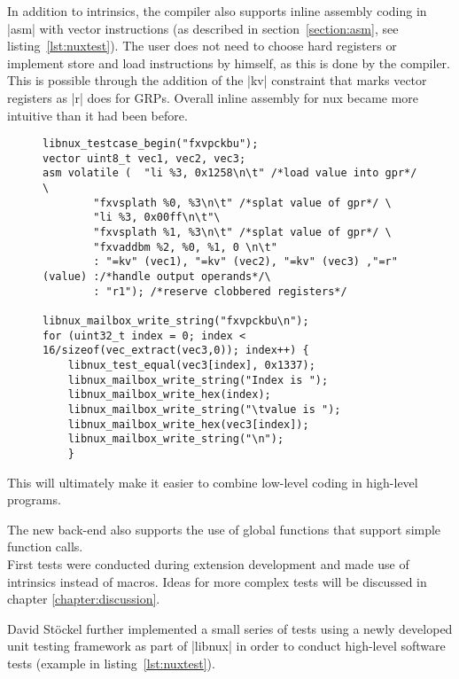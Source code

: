 In addition to intrinsics, the compiler also supports inline assembly coding in |asm| with vector instructions (as described in section~\ref{section:asm}, see listing~\ref{lst:nuxtest}).
The user does not need to choose hard registers or implement store and load instructions by himself, as this is done by the compiler.
This is possible through the addition of the |kv| constraint that marks vector registers as |r| does for GRPs.
Overall inline assembly for nux became more intuitive than it had been before.
\begin{figure}[htb]
{
\begin{lstlisting}[caption={Example of nux Test.\hspace{\textwidth} This This test directly loads two values as immediates into registers and splats them into vector registers. Those vector registers are added and the result saved in a variable. The result is then tested and also written into the mailbox for analysis.}, label=lst:nuxtest]
libnux_testcase_begin("fxvpckbu");
vector uint8_t vec1, vec2, vec3;
asm volatile (	"li %3, 0x1258\n\t" /*load value into gpr*/ \
		"fxvsplath %0, %3\n\t" /*splat value of gpr*/ \
		"li %3, 0x00ff\n\t"\
		"fxvsplath %1, %3\n\t" /*splat value of gpr*/ \
		"fxvaddbm %2, %0, %1, 0 \n\t"
		: "=kv" (vec1), "=kv" (vec2), "=kv" (vec3) ,"=r" (value) :/*handle output operands*/\
		: "r1"); /*reserve clobbered registers*/

libnux_mailbox_write_string("fxvpckbu\n");
for (uint32_t index = 0; index < 16/sizeof(vec_extract(vec3,0)); index++) {
	libnux_test_equal(vec3[index], 0x1337);
	libnux_mailbox_write_string("Index is ");
	libnux_mailbox_write_hex(index);
	libnux_mailbox_write_string("\tvalue is ");
	libnux_mailbox_write_hex(vec3[index]);
	libnux_mailbox_write_string("\n");
	}
\end{lstlisting}
}
\end{figure}

This will ultimately make it easier to combine low-level coding in high-level programs.

The new back-end also supports the use of global functions that support simple function calls.
\\
First tests were conducted during extension development and made use of intrinsics instead of macros.
Ideas for more complex tests will be discussed in chapter \ref{chapter:discussion}.

David Stöckel further implemented a small series of tests using a newly developed unit testing framework as part of |libnux| in order to conduct high-level software tests (example in listing~\ref{lst:nuxtest}).

